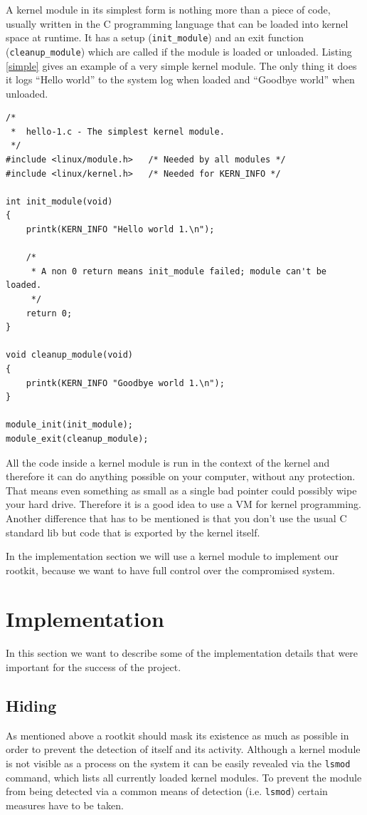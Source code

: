 \documentclass[12pt]{article}
\newcommand{\shellcmdinline}[1]{\texttt{\footnotesize #1}}
\begin{document}
A kernel module in its simplest form is nothing more than a piece of code, usually written in the C programming language that can be loaded into kernel space at runtime. It has a setup (\texttt{init\_module}) and an exit function (\texttt{cleanup\_module}) which are called if the module is loaded or unloaded. Listing \ref{simple} gives an example of a very simple kernel module. The only thing it does it logs ``Hello world'' to the system log when loaded and ``Goodbye world'' when unloaded.

\begin{lstlisting}[caption=Source: {\url{http://www.tldp.org/LDP/lkmpg/2.6/html/x121.html} , visited 2016-01-19.}, label=simple]
/*  
 *  hello-1.c - The simplest kernel module.
 */
#include <linux/module.h>	/* Needed by all modules */
#include <linux/kernel.h>	/* Needed for KERN_INFO */

int init_module(void)
{
	printk(KERN_INFO "Hello world 1.\n");

	/* 
	 * A non 0 return means init_module failed; module can't be loaded. 
	 */
	return 0;
}

void cleanup_module(void)
{
	printk(KERN_INFO "Goodbye world 1.\n");
}

module_init(init_module);
module_exit(cleanup_module);
\end{lstlisting}

All the code inside a kernel module is run in the context of the kernel and therefore it can do anything possible on your computer, without any protection. That means even something as small as a single bad pointer could possibly wipe your hard drive. Therefore it is a good idea to use a VM for kernel programming. Another difference that has to be mentioned is that you don't use the usual C standard lib but code that is exported by the kernel itself. 

In the implementation section we will use a kernel module to implement our rootkit, because we want to have full control over the compromised system.
\newpage
\section{Implementation}
\label{sec:impl}
In this section we want to describe some of the implementation details that were important for the success of the project.
\subsection{Hiding}
As mentioned above a rootkit should mask its existence as much as possible in order to prevent the detection of itself and its activity. Although a kernel module is not visible as a process on the system it can be easily revealed via the \shellcmdinline{lsmod} command, which lists all currently loaded kernel modules. To prevent the module from being detected via a common means of detection (i.e. \shellcmdinline{lsmod}) certain measures have to be taken.
\end{document}
